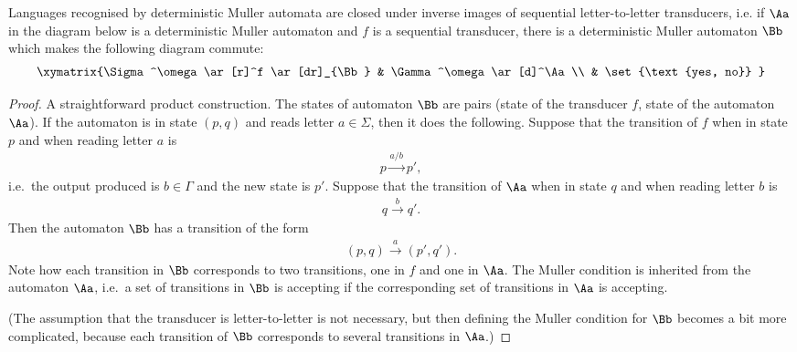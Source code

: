 \begin{lemma}\label{lem:compose-transducer-muller}
Languages recognised by deterministic Muller automata are closed under inverse images of sequential letter-to-letter transducers, i.e. if $\Aa$ in the diagram below is a deterministic Muller automaton and  $f$ is a sequential transducer, there is a deterministic Muller automaton $\Bb$ which makes the following diagram commute:
\begin{align*}
  \xymatrix{\Sigma^\omega \ar[r]^f \ar[dr]_{\Bb} & \Gamma^\omega \ar[d]^\Aa \\
  & \set{\text{yes, no}}  }
\end{align*}  
\end{lemma}
\begin{proof}
A straightforward product construction.
The states of automaton $\Bb$ are pairs (state of the transducer $f$, state of the automaton $\Aa$). If the automaton is in state $(p,q)$ and reads letter $a \in \Sigma$, then it does the following. Suppose that the transition of $f$ when in state $p$ and when reading letter $a$ is 
\begin{align*}
p \stackrel {a/b} \to p',	
\end{align*}
i.e.~the output produced is $b \in \Gamma$ and the new state is $p'$. Suppose that the transition of $\Aa$ when in state $q$ and when reading letter $b$ is 
\begin{align*}
q 	\stackrel b \to q'.
\end{align*}
Then the automaton $\Bb$ has a transition of the form
\begin{align*}
(p,q) \stackrel a \to (p',q').	
\end{align*}
Note how each transition in $\Bb$ corresponds to two transitions, one in $f$ and one in $\Aa$. 
The Muller condition is inherited from the automaton $\Aa$, i.e.~a set of transitions in $\Bb$ is accepting if the corresponding set of transitions in $\Aa$ is accepting. 

 (The assumption that the transducer is letter-to-letter is not necessary, but then defining the Muller condition for $\Bb$  becomes a bit   more complicated, because each transition of $\Bb$ corresponds to several transitions in $\Aa$.)
\end{proof}



